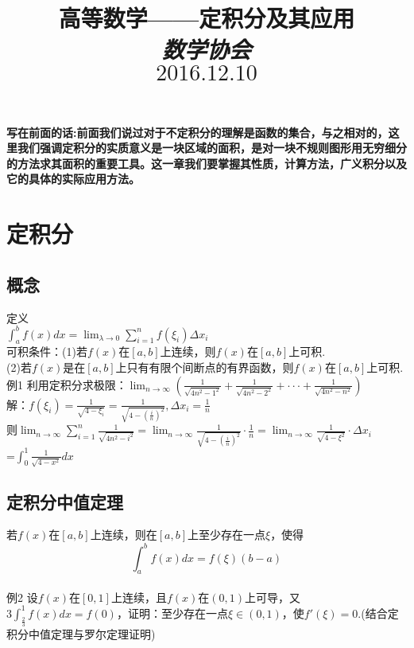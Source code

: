 \documentclass[UTF8]{ctexart}
\date{}
\title{\textbf{\small 高等数学——定积分及其应用 \\  \emph{数学协会}\\$2016.12.10$}}
\begin{document}
\maketitle
\thispagestyle{fancy}
\vspace{-20mm} \textbf{\small 写在前面的话:前面我们说过对于不定积分的理解是函数的集合，与之相对的，这里我们强调定积分的实质意义是一块区域的面积，是对一块不规则图形用无穷细分的方法求其面积的重要工具。这一章我们要掌握其性质，计算方法，广义积分以及它的具体的实际应用方法。}
\vspace{-8mm} \section{定积分}
\vspace{-4mm} \subsection{概念}  \vspace{-2mm} \small 定义
\\ $\displaystyle{\int _a^b f(x)dx =\lim_{\lambda \to 0} \sum_{i=1}^n f(\xi_i)\Delta x_i}$
\\可积条件：(1)若$f(x)$在$[a,b]$上连续，则$f(x)$在$[a,b]$上可积.
\\(2)若$f(x)$是在$[a,b]$上只有有限个间断点的有界函数，则$f(x)$在$[a,b]$上可积.
\\例1 利用定积分求极限：$\displaystyle{\lim_{n \to \infty} (\frac{1}{\sqrt{4n^2-1^2}}+\frac{1}{\sqrt{4n^2-2^2}}+\cdot\cdot\cdot+\frac{1}{\sqrt{4n^2-n^2}})}$
\\解：$\displaystyle{f(\xi_i)=\frac{1}{\sqrt{4-\xi_i}}=\frac{1}{\sqrt{4-(\frac{i}{n})^2}},\Delta x_i=\frac{1}{n}}$
\\则$\displaystyle{\lim_{n \to \infty} \sum_{i=1}^n \frac{1}{\sqrt{4n^2-i^2}}=\lim_{n \to \infty} \frac{1}{\sqrt{4-(\frac{i}{n})^2}}\cdot\frac{1}{n}=\lim_{n \to \infty} \frac{1}{\sqrt{4-\xi^2}}\cdot\Delta x_i}$
\\=$\displaystyle{\int_0^1 \frac{1}{\sqrt{4-x^2}}dx}$
\vspace{-4mm} \subsection{定积分中值定理} \vspace{-2mm}\small 若$f(x)$在$[a,b]$上连续，则在$[a,b]$上至少存在一点$\xi$，使得$$\displaystyle{\int _a^b f(x)dx=f(\xi)(b-a)}$$
\\例2 设$f(x)$在$[0,1]$上连续，且$f(x)$在$(0,1)$上可导，又$3\displaystyle{\int_{\frac{2}{3}}^1 f(x)dx=f(0)}$，证明：至少存在一点$\xi\in (0,1)$，使$f'(\xi)=0$.(结合定积分中值定理与罗尔定理证明)
\end{document}
